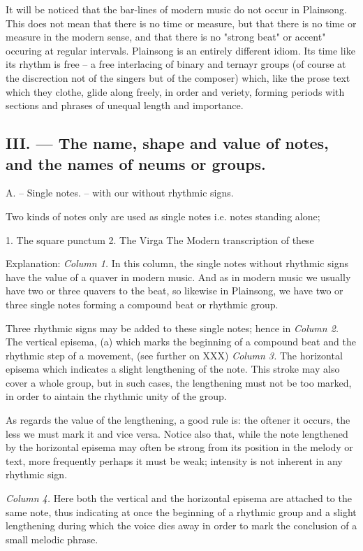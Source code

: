 It will be noticed that the bar-lines of modern music do not occur in Plainsong. This does not mean that there is no time or measure, but that there is no time or measure in the modern sense, and that there is no "strong beat" or 
accent" occuring at regular intervals. Plainsong is an entirely different idiom. Its time like its rhythm is free -- a free interlacing of binary and ternayr groups (of course at the discrection not of the singers but of the composer) which, like the prose text which they clothe, glide along freely, in order and veriety, forming periods with sections and phrases of unequal length and importance.

\subsection{III. --- The name, shape and value of notes, and the names of neums or groups.}

A. -- {\sc Single notes.} -- with our without rhythmic signs.

Two kinds of notes only are used as single notes i.e. notes standing alone;

1. The square punctum
2. The Virga
The Modern transcription of these

Explanation:
{\it Column 1.} In this column, the single notes without rhythmic signs have the value of a quaver in modern music. And as in modern music we usually have two or three quavers to the beat, so likewise in Plainsong, we have two or three single notes forming a compound beat or rhythmic group.

Three rhythmic signs may be added to these single notes; hence in
{\it Column 2.} The vertical episema, (a) which marks the beginning of a compound beat and the rhythmic step of a movement, (see further on XXX)
{\it Column 3.} The horizontal episema which indicates a slight lengthening of the note. This stroke may also cover a whole group, but in such cases, the lengthening must not be too marked, in order to aintain the rhythmic unity of the group.

As regards the value of the lengthening, a good rule is: the oftener it occurs, the less we must mark it and vice versa. Notice also that, while the note lengthened by the horizontal episema may often be strong from its position in the melody or text, more frequently perhaps it must be weak; intensity is not inherent in any rhythmic sign.

{\it Column 4.} Here both the vertical and the horizontal episema are attached to the same note, thus indicating at once the beginning of a rhythmic group and a slight lengthening during which the voice dies away in order to mark the conclusion of a small melodic phrase.


